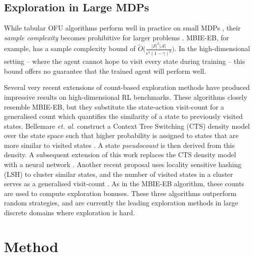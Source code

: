 \documentclass{article}
\theoremstyle{definition}
\theoremstyle{definition}
\theoremstyle{plain}
\theoremstyle{plain}
\theoremstyle{plain}
\begin{document}
\subsection{Exploration in Large MDPs\label{sub:BellemarePseudo}}

While tabular OFU algorithms perform well in practice on small MDPs
\cite{1374179}, their\emph{ sample complexity} becomes prohibitive
for larger problems \cite{Kakade:2003}. MBIE-EB, for example, has
a sample complexity bound of $\tilde{O}\big(\frac{\left|\mathcal{S}\right|^{2}\left|\mathcal{A}\right|}{\epsilon^{3}(1-\gamma)^{6}}\big)$.
In the high-dimensional setting -- where the agent cannot hope to
visit every state during training -- this bound offers no guarantee
that the trained agent will perform well. 

Several very recent extensions of count-based exploration methods
have produced impressive results on high-dimensional RL benchmarks.
These algorithms closely resemble MBIE-EB, but they substitute the
state-action visit-count for a generalised count which quantifies
the similarity of a state to previously visited states. Bellemare
\emph{et. al.} construct a Context Tree Switching (CTS) density model
over the state space such that higher probability is assigned to states
that are more similar to visited states \cite{Bellemare2016,veness2012context}.
A state \emph{pseudocount} is then derived from this density. A subsequent
extension of this work replaces the CTS density model with a neural
network \cite{DBLP:journals/corr/OstrovskiBOM17}. Another recent
proposal uses locality sensitive hashing (LSH) to cluster similar
states, and the number of visited states in a cluster serves as a
generalised visit-count \cite{Tang2016exploration}. As in the MBIE-EB
algorithm, these counts are used to compute exploration bonuses. These
three algorithms outperform random strategies, and are currently the
leading exploration methods in large discrete domains where exploration
is hard.


\section{Method}
\end{document}
